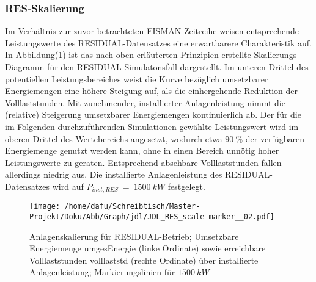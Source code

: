 \documentclass[onecolumn,10pt,titlepage]{article}
\begin{document}
\subsubsection{RES-Skalierung}
Im Verhältnis zur zuvor betrachteten EISMAN-Zeitreihe weisen entsprechende Leistungswerte des RESIDUAL-Datensatzes eine erwartbarere Charakteristik auf. In Abbildung(\ref{fig:Skal_RES}) ist das nach oben erläuterten Prinzipien erstellte Skalierungs-Diagramm für den RESIDUAL-Simulatonsfall dargestellt. Im unteren Drittel des potentiellen Leistungsbereiches weist die Kurve bezüglich umsetzbarer Energiemengen eine höhere Steigung auf, als die einhergehende Reduktion der Volllaststunden. Mit zunehmender, installierter Anlagenleistung nimmt die (relative) Steigerung umsetzbarer Energiemengen kontinuierlich ab. Der für die im Folgenden durchzuführenden Simulationen gewählte Leistungswert wird im oberen Drittel des Wertebereichs angesetzt, wodurch etwa $90~\%$ der verfügbaren Energiemenge genutzt werden kann, ohne in einen Bereich unnötig hoher Leistungswerte zu geraten. Entsprechend absehbare Volllaststunden fallen allerdings niedrig aus.
Die installierte Anlagenleistung des RESIDUAL-Datensatzes wird auf $P_{inst,RES} ~=~1500~kW$ festgelegt.
\begin{figure}[H]

	\centering
	\texttt{[image: /home/dafu/Schreibtisch/Master-Projekt/Doku/Abb/Graph/jdl/JDL\_RES\_scale-marker\_\_02.pdf]}
	\caption[Anlagenskalierung für RESIDUAL-Betrieb]{Anlagenskalierung für RESIDUAL-Betrieb; Umsetzbare Energiemenge \gls{umgesEnergie} (linke Ordinate) sowie erreichbare Volllaststunden \gls{volllaststd} (rechte Ordinate) über installierte Anlagenleistung; Markierungslinien für $1500~kW$}
	\label{fig:Skal_RES}
\end{figure}
\newpage
\end{document}
